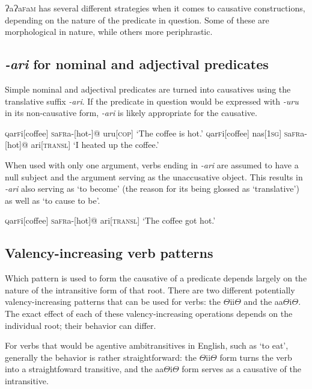 \documentclass[a4paper,10pt,twoside,openright]{memoir}
\newcommand{\lang}{ɁaɁa\textsc{f}a\textsc{m}}
\newcommand{\rootpart}{$\Theta$}
\newcommand{\famword}[5]{#1\textsc{#2}#3\textsc{#4}#5}
\begin{document}
\lang{} has several different strategies when it comes to causative constructions, depending on the nature of the predicate in question. Some of these are morphological in nature, while others more periphrastic. 

\subsection{\textit{-ari} for nominal and adjectival predicates}

Simple nominal and adjectival predicates are turned into causatives using the translative suffix \textit{-ari}. If the predicate in question would be expressed with \textit{-uru} in its non-causative form, \textit{-ari} is likely appropriate for the causative.

\pex
\a
\begingl
\famword{}{q}{ar}{f}{i}[coffee]
\famword{}{s}{a}{fr}{a}-[hot-]@
uru[\textsc{cop}]
\glft `The coffee is hot.'
\endgl
\a
\begingl
\famword{}{q}{ar}{f}{i}[coffee]
nas[\textsc{1sg}]
\famword{}{s}{a}{fr}{a}-[hot]@
ari[\textsc{transl}]
\glft `I heated up the coffee.'
\endgl
\xe

When used with only one argument, verbs ending in \textit{-ari} are assumed to have a null subject and the argument serving as the unaccusative object. This results in \textit{-ari} also serving as `to become' (the reason for its being glossed as `translative') as well as `to cause to be'.

\ex
\begingl
\famword{}{q}{ar}{f}{i}[coffee]
\famword{}{s}{a}{fr}{a}-[hot]@
ari[\textsc{transl}]
\glft `The coffee got hot.'
\endgl
\xe

\subsection{Valency-increasing verb patterns}

Which pattern is used to form the causative of a predicate depends largely on the nature of the intransitive form of that root. There are two different potentially valency-increasing patterns that can be used for verbs: the {\rootpart}ii{\rootpart} and the aa{\rootpart}i{\rootpart}. The exact effect of each of these valency-increasing operations depends on the individual root; their behavior can differ.

For verbs that would be agentive ambitransitives in English, such as `to eat', generally the behavior is rather straightforward: the {\rootpart}ii{\rootpart} form turns the verb into a straightfoward transitive, and the aa{\rootpart}i{\rootpart} form serves as a causative of the intransitive. 
\end{document}
